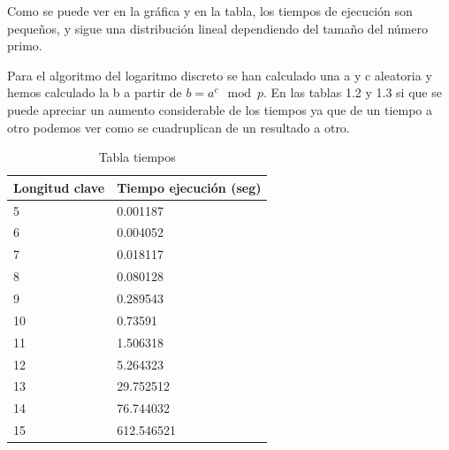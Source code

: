 Como se puede ver en la gráfica y en la tabla, los tiempos de ejecución son pequeños, y sigue una distribución lineal dependiendo del tamaño del número primo. 

Para el algoritmo del logaritmo discreto se han calculado una a y c aleatoria y hemos calculado la b a partir de $b = a^c\mod p$. En las tablas 1.2 y 1.3 si que se puede apreciar un aumento considerable de los tiempos ya que de un tiempo a otro podemos ver como se cuadruplican de un resultado a otro. \\

\begin{table}[htbp]
	\begin{center}
		\begin{tabular}{|l|l|}
			\hline
			\rowcolor{LightCyan}
			Longitud clave & Tiempo ejecución (seg) \\ \hline
			5 & 0.001187 \\ \hline 
			6 & 0.004052 \\ \hline
			7 & 0.018117 \\ \hline
			8 & 0.080128\\ \hline
			9 & 0.289543\\ \hline
			10 & 0.73591\\ \hline
			11 & 1.506318\\ \hline
			12 & 5.264323\\ \hline
			13 & 29.752512\\ \hline
			14 & 76.744032 \\ \hline
			15 & 612.546521\\ \hline
		\end{tabular}
		\caption{Tabla tiempos}
		\label{tabla:resumen}
	\end{center}
\end{table}



